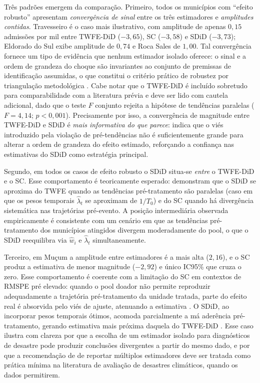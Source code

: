 \documentclass[a4paper,12pt]{article}
\begin{document}
Três padrões emergem da comparação. Primeiro, todos os municípios com
``efeito robusto'' apresentam \emph{convergência de sinal} entre os três
estimadores e \emph{amplitudes contidas}. Travesseiro é o caso mais ilustrativo,
com amplitude de apenas $0{,}15$ admissões por mil entre TWFE-DiD ($-3{,}65$),
SC ($-3{,}58$) e SDiD ($-3{,}73$); Eldorado do Sul exibe amplitude de $0{,}74$
e Roca Sales de $1{,}00$. Tal convergência fornece um tipo de evidência que
nenhum estimador isolado oferece: o sinal e a ordem de grandeza do choque
são invariantes ao conjunto de premissas de identificação assumidas, o que
constitui o critério prático de robustez por triangulação metodológica
\cite{abadie2021, chaisemartin2020}. Cabe notar que o TWFE-DiD é incluído
sobretudo para comparabilidade com a literatura prévia \cite{teixeira2024}
e deve ser lido com cautela adicional, dado que o teste $F$ conjunto rejeita
a hipótese de tendências paralelas ($F=4{,}14$; $p<0{,}001$). Precisamente
por isso, a convergência de magnitude entre TWFE-DiD e SDiD é
\emph{mais informativa do que parece}: indica que o viés introduzido pela
violação de pré-tendências não é suficientemente grande para alterar a
ordem de grandeza do efeito estimado, reforçando a confiança nas
estimativas do SDiD como estratégia principal.

Segundo, em todos os casos de efeito robusto o SDiD situa-se \emph{entre} o
TWFE-DiD e o SC. Esse comportamento é teoricamente esperado:
 demonstram que o SDiD se aproxima do TWFE
quando as tendências pré-tratamento são paralelas (caso em que os pesos
temporais $\hat{\lambda}_t$ se aproximam de $1/T_0$) e do SC quando há
divergência sistemática nas trajetórias pré-evento. A posição intermediária
observada empiricamente é consistente com um cenário em que as tendências
pré-tratamento dos municípios atingidos divergem moderadamente do pool, o que
o SDiD reequilibra via $\hat{w}_i$ e $\hat{\lambda}_t$ simultaneamente.

Terceiro, em Mu\c{c}um a amplitude entre estimadores é a mais alta ($2{,}16$),
e o SC produz a estimativa de menor magnitude ($-2{,}92$) e único IC95\% que
cruza o zero. Esse comportamento é coerente com a limitação do SC em
contextos de RMSPE pré elevado: quando o pool doador não permite
reproduzir adequadamente a trajetória pré-tratamento da unidade tratada,
parte do efeito real é absorvida pelo viés de ajuste, atenuando a estimativa
\cite{abadie2010, abadie2021}. O SDiD, ao incorporar pesos temporais ótimos,
acomoda parcialmente a má aderência pré-tratamento, gerando estimativa mais
próxima daquela do TWFE-DiD \cite{arkhangelsky2021}.
Esse caso ilustra com clareza por que a
escolha de um estimador isolado para diagnósticos de desastre pode produzir
conclusões divergentes a partir do mesmo dado, e por que a recomendação de
 de reportar múltiplos estimadores deve ser tratada
como prática mínima na literatura de avaliação de desastres climáticos, quando os dados permitirem.
\end{document}
